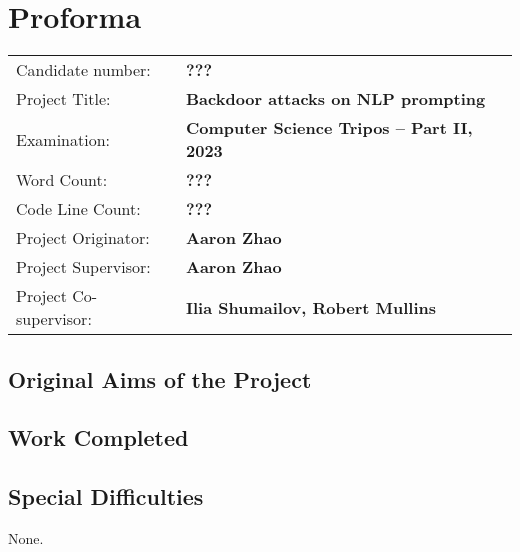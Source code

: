 \documentclass[12pt,a4paper,twoside,openright]{report}
\begin{document}
\chapter*{Proforma}
 {\large
  \begin{tabular}{ll}
	  Candidate number:   & \bf ???                                      \\
	  Project Title:      & \bf Backdoor attacks on NLP prompting        \\
	  Examination:        & \bf Computer Science Tripos -- Part II, 2023 \\
	  Word Count:         & \bf ??? \footnotemark[1]                     \\
	  Code Line Count:    & \bf ??? \footnotemark[2]                     \\
	  Project Originator: & \bf Aaron Zhao                  \\
	  Project Supervisor: & \bf Aaron Zhao                       \\
	  Project Co-supervisor: & \bf Ilia Shumailov, Robert Mullins \\
  \end{tabular}
 }

\section*{Original Aims of the Project}

\section*{Work Completed}

\section*{Special Difficulties}

None.

\tableofcontents


\newpage
{}







\newpage
{}
\printbibliography
\appendix

\end{document}
